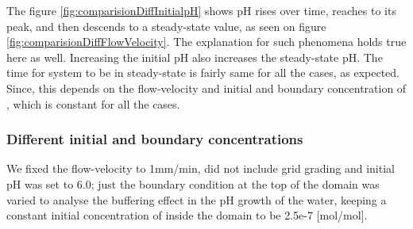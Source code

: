 The figure \ref{fig:comparisionDiffInitialpH} shows pH rises over time, reaches to its peak, and then descends to a steady-state value, 
as seen on figure \ref{fig:comparisionDiffFlowVelocity}. The explanation for such phenomena holds true here as well. Increasing the initial pH 
also increases the steady-state pH. The time for system to be in steady-state is fairly same for all the cases, as expected. Since, this 
depends on the flow-velocity and initial and boundary concentration of , which is constant for all the cases. 

\subsubsection*{Different initial and boundary  concentrations} \label{ssec:diffInitialBC}
We fixed the flow-velocity to 1mm/min, did not include grid grading and initial pH was set to 6.0; just the boundary condition at the top 
of the domain was varied to analyse the buffering effect in the pH growth of the water, keeping a constant initial concentration of  
inside the domain to be 2.5e-7 [mol/mol].

